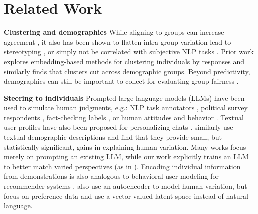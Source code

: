 \documentclass[11pt]{article}
\begin{document}
\section{Related Work} \label{sec:relatedwork}

\textbf{Clustering and demographics} While aligning to groups can increase agreement \citep{chen2024spicaretrievingscenariospluralistic}, it also has been shown to flatten intra-group variation \citep{orlikowski-etal-2023-ecological, Wang2025} lead to stereotyping \citep{cheng-etal-2023-marked}, or simply not be correlated with subjective NLP tasks \citet{orlikowski2025demographicsfinetuninglargelanguage}. 
Prior work explores embedding-based methods for clustering individuals by responses \citep{vitsakis2024voicescrowdsearchingclusters,li-etal-2024-steerability} and similarly finds that clusters cut across demographic groups.
Beyond predictivity, demographics can still be important to collect for evaluating group fairness \citep{aguirre2023selectingshotsdemographicfairness, kirk2024prismalignmentdatasetparticipatory}.

\textbf{Steering to individuals} Prompted large language models (LLMs) 
have been used
to simulate human judgments, e.g.:
NLP task annotators \citep{Bavaresco:2024}, political survey respondents \citep{argyle_busby_fulda_gubler_rytting_wingate_2023}, fact-checking labels \citep{de2024supernotes}, or human attitudes and behavior \citep{park2024generativeagentsimulations1000}. Textual user profiles have also been proposed for personalizing chats \citep{zhang-etal-2018-personalizing}.
\citet{hu2024quantifyingpersonaeffectllm} similarly use textual demographic descriptions and find that they provide small, but statistically significant, gains in explaining human variation.
Many works focus merely on prompting an existing LLM, while our work explicitly trains an LLM to better match varied perspectives (as in \citealt{Gordon_2022, jiang2024languagemodelsreasonindividualistic}). Encoding individual information from demonstrations is also analogous to behavioral user modeling for recommender systems \citep{Radlinski:2022,ramos-etal-2024-transparent}.
\citet{poddar2024variationalpreference} also use an autoencoder to model human variation, but focus on preference data and use a vector-valued latent space instead of natural language.
\end{document}
